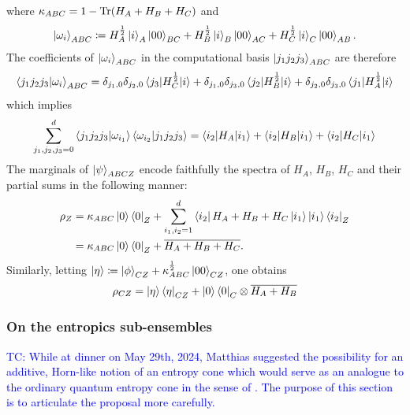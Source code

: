 \documentclass[notitlepage]{article}
\begin{document}
where $\kappa_{ABC} = 1 - \operatorname{Tr}(H_A + H_B + H_C)$ and
\begin{equation}
    \ket{\omega_i}_{ABC} \coloneqq H_A^{\frac{1}{2}}\ket{i}_{A}\ket{00}_{BC} + H_B^{\frac{1}{2}}\ket{i}_{B}\ket{00}_{AC} + H_C^{\frac{1}{2}}\ket{i}_{C}\ket{00}_{AB}.
\end{equation}
The coefficients of $\ket{\omega_i}_{ABC}$ in the computational basis $\ket{j_1 j_2 j_3}_{ABC}$ are therefore
\begin{equation}
    \braket{j_1 j_2 j_3 | \omega_i}_{ABC} = 
    \delta_{j_1,0}\delta_{j_2,0} \braket{j_3|H_C^{\frac{1}{2}}|i} +
    \delta_{j_1,0}\delta_{j_3,0} \braket{j_2|H_B^{\frac{1}{2}}|i} +
    \delta_{j_2,0}\delta_{j_3,0} \braket{j_1|H_A^{\frac{1}{2}}|i}
\end{equation}
which implies
\begin{equation}
    \sum_{j_1,j_2,j_3=0}^{d} \braket{j_1 j_2 j_3 | \omega_{i_1}} \braket{\omega_{i_2} | j_1 j_2 j_3} = \braket{i_2|H_A|i_1} +\braket{i_2|H_B|i_1} + \braket{i_2|H_C|i_1}
\end{equation}
The marginals of $\ket{\psi}_{ABCZ}$ encode faithfully the spectra of $H_A$, $H_B$, $H_C$ and their partial sums in the following manner:
\begin{align}
    \rho_{Z} 
    &= \kappa_{ABC} \ket{0}\bra{0}_{Z} + \sum_{i_1,i_2=1}^{d}\bra{i_2}H_A + H_B + H_C\ket{i_1} \ket{i_1}\bra{i_2}_{Z} \\
    &= \kappa_{ABC} \ket{0}\bra{0}_{Z} + \overline{H_A + H_B + H_C}.
\end{align}
Similarly, letting $\ket{\eta} \coloneqq \ket{\phi}_{CZ} + \kappa_{ABC}^{\frac{1}{2}} \ket{00}_{CZ}$, one obtains 
\begin{align}
    \rho_{CZ} = \ket{\eta}\bra{\eta}_{CZ} + \ket{0}\bra{0}_{C}\otimes\overline{H_A + H_B}
\end{align}

\subsubsection{On the entropics sub-ensembles}

\textcolor{blue}{TC: While at dinner on May 29th, 2024, Matthias suggested the possibility for an additive, Horn-like notion of an entropy cone which would serve as an analogue to the ordinary quantum entropy cone in the sense of \citeauthor{pippenger2003inequalities} \cite{pippenger2003inequalities}. The purpose of this section is to articulate the proposal more carefully.}
\end{document}
